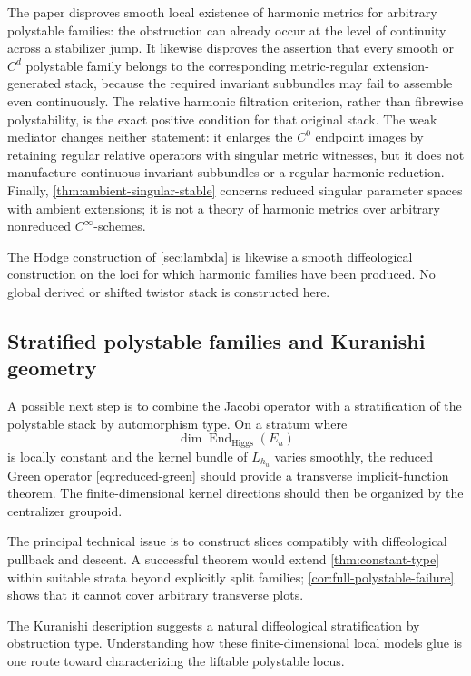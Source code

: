 \documentclass[11pt,reqno]{amsart}
\theoremstyle{definition}
\theoremstyle{remark}
\newcommand{\End}{\operatorname{End}}
\begin{document}
The paper disproves smooth local existence of harmonic metrics for arbitrary polystable families: the obstruction can already occur at the level of continuity across a stabilizer jump.  It likewise disproves the assertion that every smooth or $C^d$ polystable family belongs to the corresponding metric-regular extension-generated stack, because the required invariant subbundles may fail to assemble even continuously.  The relative harmonic filtration criterion, rather than fibrewise polystability, is the exact positive condition for that original stack.  The weak mediator changes neither statement: it enlarges the $C^0$ endpoint images by retaining regular relative operators with singular metric witnesses, but it does not manufacture continuous invariant subbundles or a regular harmonic reduction.  Finally, \cref{thm:ambient-singular-stable} concerns reduced singular parameter spaces with ambient extensions; it is not a theory of harmonic metrics over arbitrary nonreduced $C^\infty$-schemes.

The Hodge construction of \cref{sec:lambda} is likewise a smooth diffeological construction on the loci for which harmonic families have been produced.  No global derived or shifted twistor stack is constructed here.

\subsection{Stratified polystable families and Kuranishi geometry}

A possible next step is to combine the Jacobi operator with a stratification of the polystable stack by automorphism type.  On a stratum where
\[
  \dim\End_{\mathrm{Higgs}}(E_u)
\]
is locally constant and the kernel bundle of $L_{h_u}$ varies smoothly, the reduced Green operator \eqref{eq:reduced-green} should provide a transverse implicit-function theorem.  The finite-dimensional kernel directions should then be organized by the centralizer groupoid.

The principal technical issue is to construct slices compatibly with diffeological pullback and descent.  A successful theorem would extend \cref{thm:constant-type} within suitable strata beyond explicitly split families; \cref{cor:full-polystable-failure} shows that it cannot cover arbitrary transverse plots.


The Kuranishi description suggests a natural diffeological stratification by obstruction type.  Understanding how these finite-dimensional local models glue is one route toward characterizing the liftable polystable locus.
\end{document}
